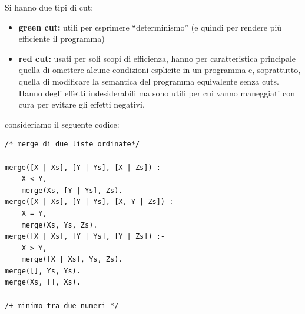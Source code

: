 \documentclass[a4paper]{report}
\begin{document}
\begin{itemize}
\begin{center}
\end{center}
Si hanno due tipi di cut:
\begin{itemize}
\item \textbf{green cut: } utili per esprimere “determinismo” (e quindi per rendere più efficiente il programma)
\item \textbf{red cut: } usati per soli scopi di efficienza, hanno per caratteristica principale quella di omettere
  alcune condizioni esplicite in un programma e, soprattutto, quella di modificare la semantica del programma equivalente senza cuts.
  Hanno degli effetti indesiderabili ma sono utili per cui vanno maneggiati con cura per evitare gli effetti negativi.
\end{itemize}
consideriamo il seguente codice:
\begin{verbatim}
/* merge di due liste ordinate*/

merge([X | Xs], [Y | Ys], [X | Zs]) :-
	X < Y,
	merge(Xs, [Y | Ys], Zs).
merge([X | Xs], [Y | Ys], [X, Y | Zs]) :-
	X = Y,
	merge(Xs, Ys, Zs).
merge([X | Xs], [Y | Ys], [Y | Zs]) :-
	X > Y,
	merge([X | Xs], Ys, Zs).
merge([], Ys, Ys).
merge(Xs, [], Xs).

/+ minimo tra due numeri */


\end{verbatim}
\end{itemize}
\end{document}
